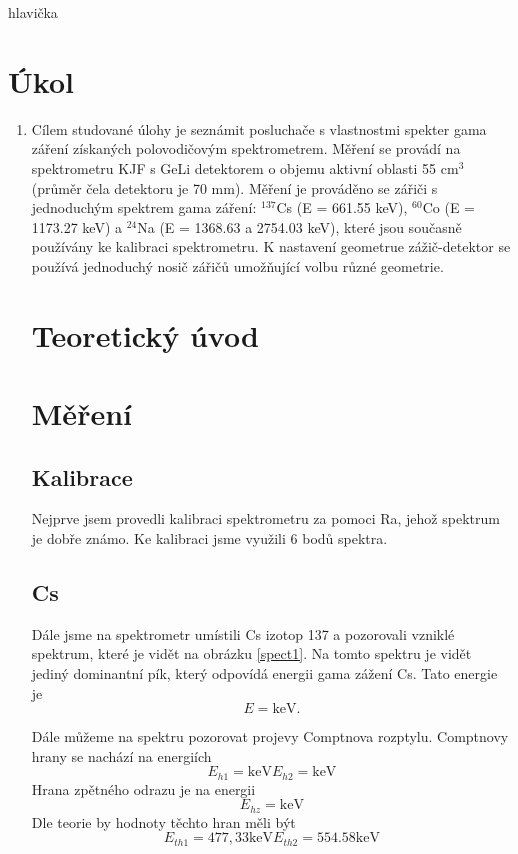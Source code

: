 hlavička

\section{Úkol}
\begin{enumerate}
    \item Cílem studované úlohy je seznámit posluchače s vlastnostmi spekter gama záření získaných polovodičovým spektrometrem.
    Měření se provádí na spektrometru KJF s GeLi detektorem o objemu aktivní oblasti 55 cm$^3$ (průměr čela detektoru je 70 mm). 
    Měření je prováděno se zářiči s jednoduchým spektrem gama záření: $^137$Cs (E = 661.55 keV), $^60$Co (E = 1173.27 keV) a 
    $^24$Na (E = 1368.63 a 2754.03 keV), které jsou současně používány ke kalibraci spektrometru. K nastavení geometrue zážič-detektor 
    se používá jednoduchý nosič zářičů umožňující volbu různé geometrie.

\section{Teoretický úvod}

\section{Měření}
\subsection{Kalibrace}
Nejprve jsem provedli kalibraci spektrometru za pomoci Ra, jehož spektrum je dobře známo.
Ke kalibraci jsme využili 6 bodů spektra.

\subsection{Cs}
Dále jsme na spektrometr umístili Cs izotop 137 a pozorovali vzniklé spektrum, které je vidět na obrázku \ref{spect1}. 
Na tomto spektru je vidět jediný dominantní pík, který odpovídá energii gama zážení Cs. Tato energie je 
$$
E=  \mbox{keV}.
$$

Dále můžeme na spektru pozorovat projevy Comptnova rozptylu. Comptnovy hrany se nachází na energiích
$$
E_{h1}= \mbox{keV}
E_{h2}= \mbox{keV}
$$
Hrana zpětného odrazu je na energii
$$
E_{hz}= \mbox{keV}
$$
Dle teorie by hodnoty těchto hran měli být
$$
E_{th1}=477,33 \mbox{keV}
E_{th2}=554.58 \mbox{keV}
$$


\end{enumerate}
